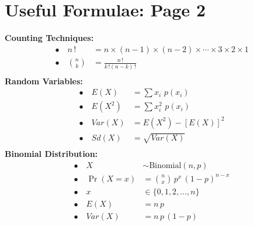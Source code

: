 \documentclass[12pt]{article}
\begin{document}
\newpage

\section*{Useful Formulae: Page 2\\[0.3cm]}
{\bf Counting Techniques:}\\[-0.8cm]
\begin{align*}
\bullet\quad n\,! &= n\times(n-1)\times(n-2)\times\cdots\times3\times2\times 1\\[0.6cm]
\bullet\quad \binom{n}{k} &= \frac{n\,!}{k\,! (n-k)\,!}\\
\end{align*}
{\bf Random Variables:}\\[-0.8cm]
\begin{align*}
\bullet\quad E(X) &= \sum x_i \,\, p(x_i)\\[0.6cm]
\bullet\quad E(X^2) &= \sum x_i^2 \,\, p(x_i)\\[0.6cm]
\bullet\quad Var(X) &= E(X^2) - [E(X)]^2\\[0.6cm]
\bullet\quad Sd(X) &= \sqrt{Var(X)}\\
\end{align*}
{\bf Binomial Distribution:}\\[-0.8cm]
\begin{align*}
\bullet\quad X &\sim \text{Binomial}(n,p)\\[0.6cm]
\bullet\quad \Pr(X=x) &= \binom{n}{x}\,p^x\,(1-p)^{n-x}\\[0.6cm]
\bullet\quad x &\in \{0,1,2,\ldots,n\}\\[0.6cm]
\bullet\quad E(X) &= n\,p \\[0.6cm]
\bullet\quad Var(X) &= n\,p\,(1-p)\\
\end{align*}

\newpage
\end{document}
